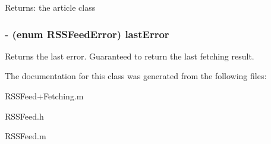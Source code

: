 \begin{Desc}
\item[Returns:]the article class \end{Desc}
\subsubsection{\setlength{\rightskip}{0pt plus 5cm}- (enum RSSFeed\-Error) {\bf last\-Error}\hspace{0.3cm}{\tt  [protected]}}\label{classRSSFeed_461f168ad127ec8e2b27daa991fcad41}


Returns the last error. Guaranteed to return the last fetching result. 

The documentation for this class was generated from the following files:\begin{CompactItemize}
\item 
RSSFeed+Fetching.m\item 
RSSFeed.h\item 
RSSFeed.m\end{CompactItemize}
